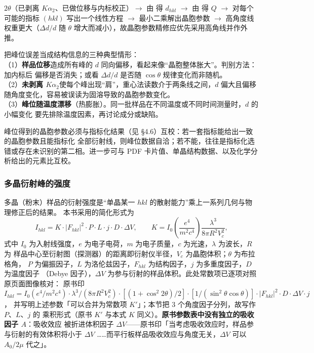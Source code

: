 \begin{dataflow}
$2\theta$（已剥离 $K\alpha_{2}$、已做位移与内标校正）$\rightarrow$ 由 得
$d_{hkl}$ $\rightarrow$ 由 得 $Q$ $\rightarrow$ 对每个可能的指标 $(hkl)$
写出一个线性方程 $\rightarrow$ 最小二乘解出晶胞参数 $\rightarrow$ 高角度线权重更大（$\Delta d/d$
随 $\theta$ 增大而减小），故晶胞参数精修应优先采用高角线并作外推。
\end{dataflow}

\begin{pitfall}
把峰位误差当成结构信息的三种典型情形：\\
（1）\textbf{样品位移}造成所有峰的 $d$ 同向偏移，看起来像“晶胞整体胀大”。判别方法：加内标后
偏移是否消失；或看 $\Delta d/d$ 是否随 $\cos\theta$ 规律变化而非随机。\\
（2）\textbf{未剥离 $K\alpha_{2}$}使每个峰出现“肩”，重心法读数介于两条线之间，$d$ 偏大且偏移
随角度变化，容易被误读为固溶导致的晶胞参数变化。\\
（3）\textbf{峰位随温度漂移}（热膨胀）。同一批样品在不同温度或不同时间测量时，$d$ 的小幅变化
要先排除温度因素，再讨论成分或缺陷。
\end{pitfall}

\begin{crosscheck}
峰位得到的晶胞参数必须与指标化结果（见 §4.6）互校：若一套指标能给出一致的晶胞参数且能指标化
全部衍射线，则峰位数据自洽；若不能，往往是指标化选错或存在未识别的第二相。进一步可与 PDF
卡片值、单晶结构数据、以及化学分析给出的元素比互校。
\end{crosscheck}

\subsubsection{多晶衍射峰的强度}

\begin{principle}
多晶（粉末）样品的衍射强度是“单晶某一 $hkl$ 的散射能力”乘上一系列几何与物理修正后的结果。
本书采用的简化形式为
\begin{equation}
I_{hkl}=K\cdot\left|F_{hkl}\right|^{2}\cdot P\cdot L\cdot j\cdot D\cdot\Delta V,
\qquad
K=I_{0}\left(\frac{e^{4}}{m^{2}c^{4}}\right)\frac{\lambda^{3}}{8\pi R^{2}V_{c}^{2}},
\label{eq:ch04b-intensity}
\end{equation}
式中 $I_{0}$ 为入射线强度，$e$ 为电子电荷，$m$ 为电子质量，$c$ 为光速，$\lambda$ 为波长，$R$ 为
样品中心至衍射图（探测器）的距离即衍射仪半径，$V_{c}$ 为晶胞体积；$\theta$ 为布拉格角，
$P$ 为偏振因子，$L$ 为洛伦兹因子，$F_{hkl}$ 为结构因子，$j$ 为多重度因子，$D$ 为温度因子
（Debye 因子），$\Delta V$ 为参与衍射的样品体积。此处常数项已逐项对照原页面图像核对：
原书印
$I_{hkl}=I_{0}(e^{4}/m^{2}c^{4})\cdot\lambda^{3}/(8\pi R^{2}V_{c}^{2})\cdot
[(1+\cos^{2}2\theta)/2]\cdot[1/(\sin^{2}\theta\cos\theta)]\cdot|F_{hkl}|^{2}\cdot D\cdot\Delta V\cdot j$，
并写明上述参数「可以合并为常数项 $K'$」；本节把 $3$ 个角度因子分列，故写作 $P$、$L$、$j$ 的
乘积形式（原书 $K'$ 与本式 $K$ 同义）。\textbf{原书参数表中没有独立的吸收因子 $A$}：吸收效应
被折进体积因子 $\Delta V$——原书印「当考虑吸收效应时，样品参与衍射的有效体积将小于 $\Delta V$
……而平行板样品吸收效应与角度无关，$\Delta V$ 可以 $A_{0}/2\mu$ 代之」。
\end{principle}


